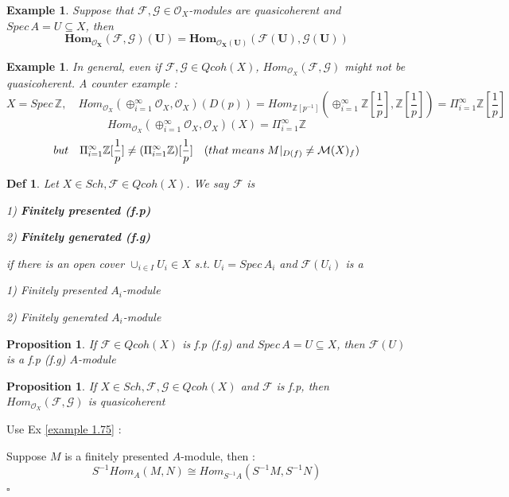 \documentclass{article}
\newtheorem{definition}[theorem]{Def}
\newtheorem{example}[theorem]{Example}
\newtheorem{proposition}[theorem]{Proposition}
\newenvironment{Proof}{{\noindent \indent \it Proof:\quad}}{\hfill $\square$\par}
\begin{document}
\begin{example}
    Suppose that $\mathcal F,\mathcal G\in \mathcal O_X$-modules are quasicoherent and $Spec\,A=U\subseteq X$, then 
    $$
    \bm{{Hom}_{\mathcal O_X}(\mathcal F,\mathcal G)(U)
    = {Hom}_{\mathcal O_X(U)}(\mathcal F(U),\mathcal G(U))} 
    $$
\end{example}

\begin{example}
    In general, even if $\mathcal F,\mathcal G\in Qcoh(X)$, ${Hom}_{\mathcal O_X}(\mathcal F,\mathcal G)$ might not be quasicoherent. A counter example :
    $$
    X=Spec\,\mathbb Z,\quad {Hom}_{\mathcal O_X}(\oplus_{i=1}^{\infty}\mathcal O_X,\mathcal O_X)(D(p))
    =Hom_{\mathbb Z[p^{-1}]}(\oplus_{i=1}^{\infty}\mathbb Z[\frac{1}{p}],\mathbb Z[\frac{1}{p}])
    =\Pi_{i=1}^{\infty}
    \mathbb Z[\frac{1}{p}]
    $$
    $$
    Hom_{\mathcal O_X}(\oplus_{i=1}^{\infty}\mathcal O_X,\mathcal O_X)(X)=\Pi_{i=1}^{\infty} \mathbb Z
    $$
    $$
    but \quad \Pi_{i=1}^{\infty}
    \mathbb Z[\frac{1}{p}]
    \ne
    (\Pi_{i=1} ^{\infty}  
    \mathbb Z) [\frac{1}{p}]\quad (that\;means\;\mathcal \mathcal M|_{D(f)}\ne \mathcal M(X)_f) 
    $$
\end{example}

\begin{definition}
    Let $X\in Sch,\mathcal F\in Qcoh(X)$. We say $\mathcal F$ is 

    1) \textbf{Finitely presented (f.p)}

    2) \textbf{Finitely generated (f.g)}

    if there is an open cover $\cup_{i\in I}U_i\in X$ s.t. $U_i=Spec\,A_i$ and $\mathcal F(U_i)$ is a

    1) Finitely presented $A_i$-module

    2) Finitely generated $A_i$-module
\end{definition}

\begin{proposition}
    If $\mathcal F\in Qcoh(X)$ is f.p (f.g) and $Spec\,A=U\subseteq X$, then $\mathcal F(U)$ is a f.p (f.g) $A$-module
\end{proposition}

\begin{proposition}
    If $X\in Sch,\mathcal F,\mathcal G\in Qcoh(X)$ and $\mathcal F$ is f.p, then $Hom_{\mathcal O_X}(\mathcal F,\mathcal G)$ is quasicoherent
\end{proposition}
\begin{Proof}
Use Ex \ref{example 1.75} :

Suppose $M$ is a finitely presented $A$-module, then :
\begin{equation*}
S^{-1} Hom_A(M, N) \cong Hom_{S^{-1}A}(S^{-1}M, S^{-1}N)
\end{equation*}
\end{Proof}
\end{document}
